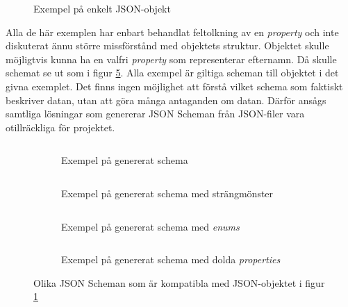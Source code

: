 \begin{figure}
	\inputminted[tabsize=2, frame=single, fontsize=\small, framesep=2mm]{json}{code/schema-generation-example/json-file.json}
	\vspace{-1.7em}
	\caption{Exempel på enkelt JSON-objekt}
	\label{fig:json-super-simple-example}
\end{figure}

Alla de här exemplen har enbart behandlat feltolkning av en \textit{property} och inte diskuterat ännu större missförstånd med objektets struktur. Objektet skulle möjligtvis kunna ha en valfri \textit{property} som representerar efternamn. Då skulle schemat se ut som i figur \ref{fig:schema-super-simple-example-4}. Alla exempel är giltiga scheman till objektet i det givna exemplet. Det finns ingen möjlighet att förstå vilket schema som faktiskt beskriver datan, utan att göra många antaganden om datan. Därför ansågs samtliga lösningar som genererar JSON Scheman från JSON-filer vara otillräckliga för projektet.

\begin{figure}
	\begin{subfigure}[t]{0.47\textwidth}
		\inputminted[tabsize=2, frame=single, fontsize=\small, framesep=2mm]{json}{code/schema-generation-example/schema-example1.json}
		\vspace{-1.2em}
		\caption{Exempel på genererat schema}
		\label{fig:schema-super-simple-example-1}
	\end{subfigure}\hfill
	\begin{subfigure}[t]{0.47\textwidth}
		\inputminted[tabsize=2, frame=single, fontsize=\small, framesep=2mm]{json}{code/schema-generation-example/schema-example2.json}
		\vspace{-1.2em}
		\caption{Exempel på genererat schema med strängmönster}
		\label{fig:schema-super-simple-example-2}
		\vspace{.8em}
	\end{subfigure}
	\begin{subfigure}[t]{0.47\textwidth}
		\inputminted[tabsize=2, frame=single, fontsize=\small, framesep=2mm]{json}{code/schema-generation-example/schema-example3.json}
		\vspace{-1.2em}
		\caption{Exempel på genererat schema med \textit{enums}}
		\label{fig:schema-super-simple-example-3}
	\end{subfigure}\hfill
	\begin{subfigure}[t]{0.47\textwidth}
		\inputminted[tabsize=2, frame=single, fontsize=\small, framesep=2mm]{json}{code/schema-generation-example/schema-example4.json}
		\vspace{-1.2em}
		\caption{Exempel på genererat schema med dolda \textit{properties}}
		\label{fig:schema-super-simple-example-4}
	\end{subfigure}
	\caption{Olika JSON Scheman som är kompatibla med JSON-objektet i figur \ref{fig:json-super-simple-example}}
	\label{fig:schema-super-simple-example-group}
\end{figure}



